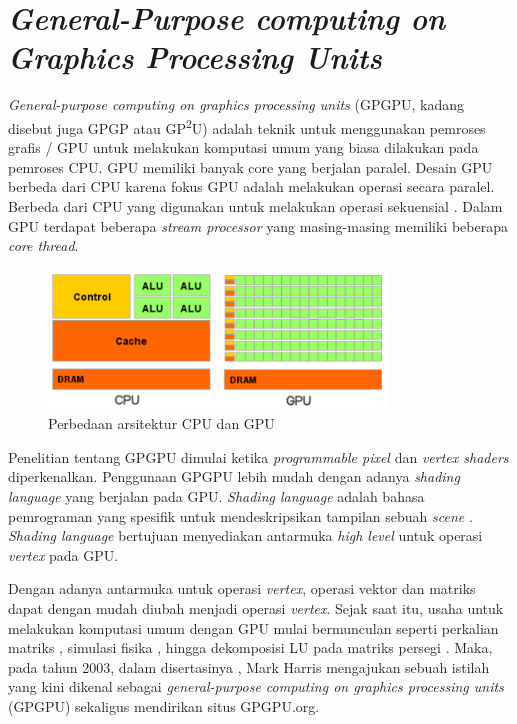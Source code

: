 \section{\emph{General-Purpose computing on Graphics Processing Units}}

  \emph{General-purpose computing on graphics processing units} (GPGPU, kadang disebut juga GPGP atau GP\textsuperscript{2}U) adalah teknik untuk menggunakan pemroses grafis / GPU untuk melakukan komputasi umum yang biasa dilakukan pada pemroses CPU. GPU memiliki banyak core yang berjalan paralel. Desain GPU berbeda dari CPU karena fokus GPU adalah melakukan operasi secara paralel. Berbeda dari CPU yang digunakan untuk melakukan operasi sekuensial \parencite{lindholm2001}. Dalam GPU terdapat beberapa \emph{stream processor} yang masing-masing memiliki beberapa \emph{core thread}.

  \begin{figure}[H]
    \centering
    \includegraphics[width=0.8\textwidth]{resources/GPUvsCPU.png}
    \caption{Perbedaan arsitektur CPU dan GPU \parencite{cuda}}
  \end{figure}

  Penelitian tentang GPGPU dimulai ketika \emph{programmable pixel} dan \emph{vertex shaders} diperkenalkan. Penggunaan GPGPU lebih mudah dengan adanya \emph{shading language} yang berjalan pada GPU. \emph{Shading language} adalah bahasa pemrograman yang spesifik untuk mendeskripsikan tampilan sebuah \emph{scene} \parencite{proudfoot2001}. \emph{Shading language} bertujuan menyediakan antarmuka \emph{high level} untuk operasi \emph{vertex} pada GPU. 

  Dengan adanya antarmuka untuk operasi \emph{vertex}, operasi vektor dan matriks dapat dengan mudah diubah menjadi operasi \emph{vertex}. Sejak saat itu, usaha untuk melakukan komputasi umum dengan GPU mulai bermunculan seperti perkalian matriks \parencite{matrix2001}, simulasi fisika \parencite{phys2002}, hingga dekomposisi LU pada matriks persegi \parencite{lugpu2005}. Maka, pada tahun 2003, dalam disertasinya \parencite{harris2003}, Mark Harris mengajukan sebuah istilah yang kini dikenal sebagai \emph{general-purpose computing on graphics processing units} (GPGPU) sekaligus mendirikan situs GPGPU.org.

